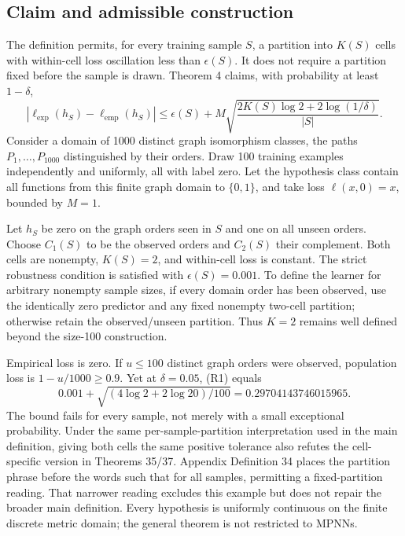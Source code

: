 \documentclass[10pt]{article}
\begin{document}
\subsection*{Claim and admissible construction}
The definition permits, for every training sample \(S\), a partition into \(K(S)\) cells with within-cell loss oscillation less than \(\epsilon(S)\). It does not require a partition fixed before the sample is drawn. Theorem 4 claims, with probability at least \(1-\delta\), \[|\ell_{\exp}(h_S)-\ell_{\mathrm{emp}}(h_S)|
 \le\epsilon(S)+M\sqrt{\frac{2K(S)\log2+2\log(1/\delta)}{|S|}}. \tag{R1}\] Consider a domain of 1000 distinct graph isomorphism classes, the paths \(P_1,\ldots,P_{1000}\) distinguished by their orders. Draw 100 training examples independently and uniformly, all with label zero. Let the hypothesis class contain all functions from this finite graph domain to \(\{0,1\}\), and take loss \(\ell(x,0)=x\), bounded by \(M=1\).\par
Let \(h_S\) be zero on the graph orders seen in \(S\) and one on all unseen orders. Choose \(C_1(S)\) to be the observed orders and \(C_2(S)\) their complement. Both cells are nonempty, \(K(S)=2\), and within-cell loss is constant. The strict robustness condition is satisfied with \(\epsilon(S)=0.001\). To define the learner for arbitrary nonempty sample sizes, if every domain order has been observed, use the identically zero predictor and any fixed nonempty two-cell partition; otherwise retain the observed/unseen partition. Thus \(K=2\) remains well defined beyond the size-100 construction.\par
Empirical loss is zero. If \(u\le100\) distinct graph orders were observed, population loss is \(1-u/1000\ge0.9\). Yet at \(\delta=0.05\), (R1) equals \[0.001+\sqrt{(4\log2+2\log20)/100}
 =0.29704143746015965.\] The bound fails for every sample, not merely with a small exceptional probability. Under the same per-sample-partition interpretation used in the main definition, giving both cells the same positive tolerance also refutes the cell-specific version in Theorems 35/37. Appendix Definition 34 places the partition phrase before the words such that for all samples, permitting a fixed-partition reading. That narrower reading excludes this example but does not repair the broader main definition. Every hypothesis is uniformly continuous on the finite discrete metric domain; the general theorem is not restricted to MPNNs.\par
\end{document}
